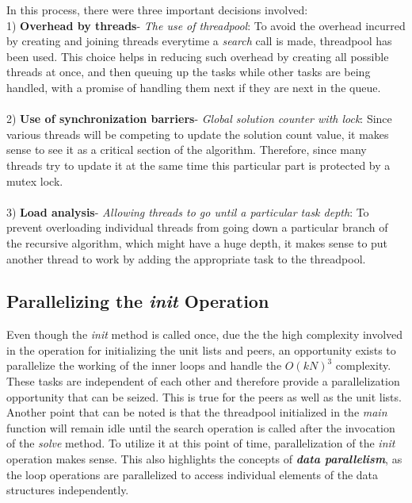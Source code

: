 \documentclass[a4paper,10pt,twoside]{article}
\begin{document}
In this process, there were three important decisions involved: \\
1) \textbf{Overhead by threads}- \textit{The use of threadpool}: To avoid the overhead incurred by creating and joining threads everytime a \textit{search} call is made, threadpool has been used. This choice helps in reducing such overhead by creating all possible threads at once, and then queuing up the tasks while other tasks are being handled, with a promise of handling them next if they are next in the queue. \\ \\
2) \textbf{Use of synchronization barriers}- \textit{Global solution counter with lock}: Since various threads will be competing to update the solution count value, it makes sense to see it as a critical section of the algorithm. Therefore, since many threads try to update it at the same time this particular part is protected by a mutex lock.\\ \\
3) \textbf{Load analysis}- \textit{Allowing threads to go until a particular task depth}: To prevent overloading individual threads from going down a particular branch of the recursive algorithm, which might have a huge depth, it makes sense to put another thread to work by adding the appropriate task to the threadpool.
\subsection{Parallelizing the \textit{init} Operation}
Even though the \textit{init} method is called once, due the the high complexity involved in the operation for initializing the unit lists and peers, an opportunity exists to parallelize the working of the inner loops and handle the $O(kN)^{3}$ complexity. These tasks are independent of each other and therefore provide a parallelization opportunity that can be seized. This is true for the peers as well as the unit lists. Another point that can be noted is that the threadpool initialized in the \textit{main} function will remain idle until the search operation is called after the invocation of the \textit{solve} method. To utilize it at this point of time, parallelization of the \textit{init} operation makes sense. This also highlights the concepts of \textbf{\textit{data parallelism}}, as the loop operations are parallelized to access individual elements of the data structures independently.
\end{document}
